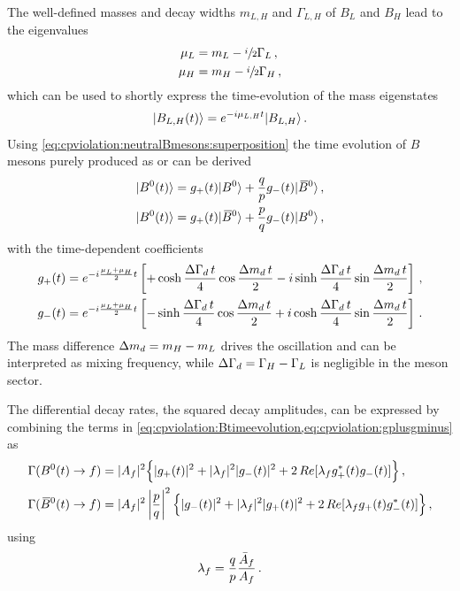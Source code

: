The well-defined masses and decay widths
$m_{L,H}$ and $\Gamma_{L,H}$ of $B_L$ and $B_H$ lead to the eigenvalues
\begin{align}
\begin{split}
	\mu_L &= m_L - \sfrac{i}{2}\Gamma_L \,,\\
	\mu_H &= m_H - \sfrac{i}{2}\Gamma_H \,,
\end{split}
\end{align}
which can be used to shortly express the time-evolution of the mass eigenstates
\begin{align}
	|B_{L,H}(t)\rangle = e^{-i\mu_{L,H}t} |B_{L,H}\rangle\,.
\end{align}
Using \cref{eq:cpviolation:neutralBmesons:superposition} the time evolution of
$B$ mesons purely produced as \Bd or \Bdb can be derived
\begin{align}
\begin{split}
	|{{B}^0}(t)\rangle = g_+(t)|{{B}^0}\rangle  + \frac qp g_-(t)|{{\kern 0.18em\overline{\kern -0.18em B}{}}{}^0}\rangle\,,\\
	|{{B}^0}(t)\rangle = g_+(t)|{{\kern 0.18em\overline{\kern -0.18em B}{}}{}^0}\rangle + \frac pq g_-(t)|{{B}^0}\rangle \,,
\end{split}
\label{eq:cpviolation:Btimeevolution}
\end{align}
with the time-dependent coefficients
\begin{align}
\begin{split}
	g_+(t) = e^{-i\frac{\mu_L + \mu_H}{2}t}\left[+\cosh\frac{{\Delta\Gamma_{{d}}}\,t}{4} \cos\frac{{\Delta m_{{d}}}\,t}{2} - i \sinh\frac{{\Delta\Gamma_{{d}}}\,t}{4} \sin\frac{{\Delta m_{{d}}}\,t}{2}\right]\,,\\
	g_-(t) = e^{-i\frac{\mu_L + \mu_H}{2}t}\left[-\sinh\frac{{\Delta\Gamma_{{d}}}\,t}{4} \cos\frac{{\Delta m_{{d}}}\,t}{2} + i \cosh\frac{{\Delta\Gamma_{{d}}}\,t}{4} \sin\frac{{\Delta m_{{d}}}\,t}{2}\right]\,.
\end{split}
\label{eq:cpviolation:gplusgminus}
\end{align}
The mass difference ${\Delta m_{{d}}} = m_H - m_L$ drives the oscillation and can be
interpreted as mixing frequency, while ${\Delta\Gamma_{{d}}} = \Gamma_H - \Gamma_L$ is
negligible in the \Bd meson sector.

The differential decay rates, \ie the squared decay amplitudes, can be
expressed by combining the terms in
\cref{eq:cpviolation:Btimeevolution,eq:cpviolation:gplusgminus} as
\begin{align}
\begin{split}
	\Gamma({{B}^0}(t)\rightarrow f) &= |A_{f}|^2 \Big\{|g_+(t)|^2 + |\lambda_f|^2|g_-(t)|^2 + 2\,Re[\lambda_f g_+^\ast(t)g_-(t)]\Big\}\,,\\
	\Gamma({{\kern 0.18em\overline{\kern -0.18em B}{}}{}^0}(t)\rightarrow f) &= |A_{f}|^2 \left|\frac pq \right|^2 \Big\{|g_-(t)|^2 + |\lambda_f|^2|g_+(t)|^2 + 2\,Re[\lambda_f g_+(t)g_-^{\ast}(t)]\Big\}\,,
\end{split}
\label{eq:cpviolation:complexdecayrates}
\end{align}
using
\begin{align}
	\lambda_f = \frac qp \frac{\bar{A}_{f}}{A_{f}}\,.
\label{eq:cpviolation:lambda}
\end{align}
